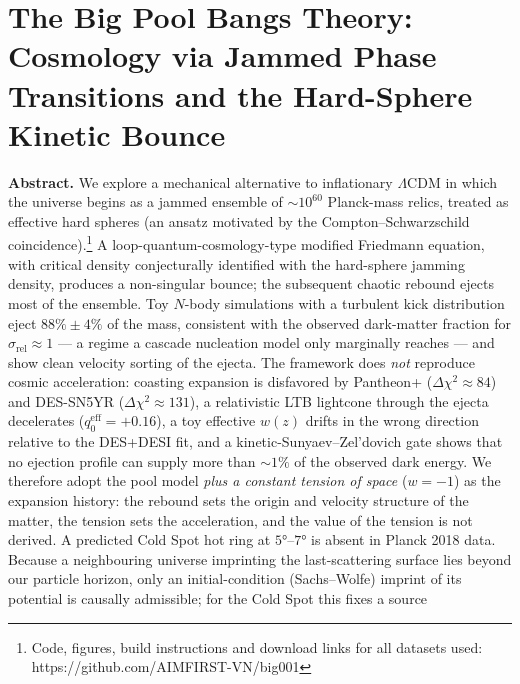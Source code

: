 \documentclass[
]{article}
\author{}
\date{}
\begin{document}
\hypertarget{the-big-pool-bangs-theory-cosmology-via-jammed-phase-transitions-and-the-hard-sphere-kinetic-bounce}{%
\section{\texorpdfstring{\textbf{The Big Pool Bangs Theory: Cosmology
via Jammed Phase Transitions and the Hard-Sphere Kinetic
Bounce}}{The Big Pool Bangs Theory: Cosmology via Jammed Phase Transitions and the Hard-Sphere Kinetic Bounce}}\label{the-big-pool-bangs-theory-cosmology-via-jammed-phase-transitions-and-the-hard-sphere-kinetic-bounce}}

\textbf{Abstract.} We explore a mechanical alternative to inflationary
\(\Lambda\)CDM in which the universe begins as a jammed ensemble of
\(\sim\!10^{60}\) Planck-mass relics, treated as effective hard spheres
(an ansatz motivated by the Compton--Schwarzschild
coincidence).\footnote{Code, figures, build instructions and download
  links for all datasets used: https://github.com/AIMFIRST-VN/big001} A
loop-quantum-cosmology-type modified Friedmann equation, with critical
density conjecturally identified with the hard-sphere jamming density,
produces a non-singular bounce; the subsequent chaotic rebound ejects
most of the ensemble. Toy \(N\)-body simulations with a turbulent kick
distribution eject \(88\% \pm 4\%\) of the mass, consistent with the
observed dark-matter fraction for \(\sigma_{\text{rel}} \approx 1\) ---
a regime a cascade nucleation model only marginally reaches --- and show
clean velocity sorting of the ejecta. The framework does \emph{not}
reproduce cosmic acceleration: coasting expansion is disfavored by
Pantheon+ (\(\Delta\chi^2 \approx 84\)) and DES-SN5YR
(\(\Delta\chi^2 \approx 131\)), a relativistic LTB lightcone through the
ejecta decelerates (\(q_0^{\text{eff}} = +0.16\)), a toy effective
\(w(z)\) drifts in the wrong direction relative to the DES+DESI fit, and
a kinetic-Sunyaev--Zel'dovich gate shows that no ejection profile can
supply more than \(\sim\!1\%\) of the observed dark energy. We therefore
adopt the pool model \emph{plus a constant tension of space} (\(w=-1\))
as the expansion history: the rebound sets the origin and velocity
structure of the matter, the tension sets the acceleration, and the
value of the tension is not derived. A predicted Cold Spot hot ring at
\(5°\)--\(7°\) is absent in Planck 2018 data. Because a neighbouring
universe imprinting the last-scattering surface lies beyond our particle
horizon, only an initial-condition (Sachs--Wolfe) imprint of its
potential is causally admissible; for the Cold Spot this fixes a source
\end{document}
